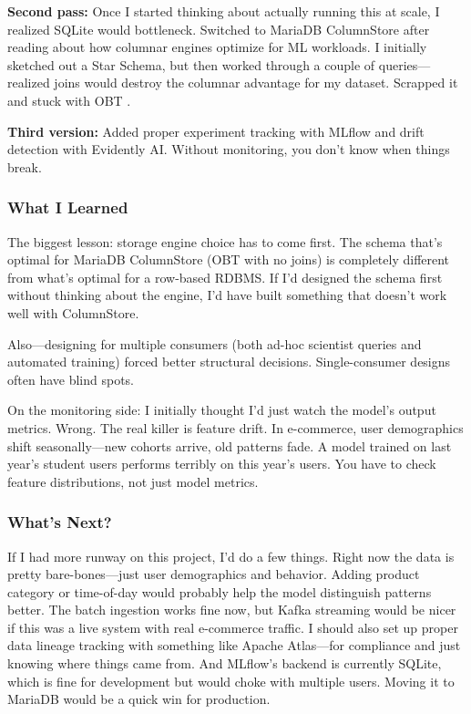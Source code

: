 \documentclass[11pt,a4paper]{article}
\begin{document}
\textbf{Second pass:} Once I started thinking about actually running this at scale, I realized 
SQLite would bottleneck. Switched to MariaDB ColumnStore after reading about how columnar 
engines optimize for ML workloads. I initially sketched out a Star Schema, but then worked 
through a couple of queries—realized joins would destroy the columnar advantage for my dataset. 
Scrapped it and stuck with OBT \citep{zaitsev2021}.

\textbf{Third version:} Added proper experiment tracking with MLflow and drift detection with 
Evidently AI. Without monitoring, you don't know when things break.

\subsubsection*{What I Learned}

The biggest lesson: storage engine choice has to come first. The schema that's optimal for 
MariaDB ColumnStore (OBT with no joins) is completely different from what's optimal for a 
row-based RDBMS. If I'd designed the schema first without thinking about the engine, I'd have 
built something that doesn't work well with ColumnStore.

Also—designing for multiple consumers (both ad-hoc scientist queries and automated training) 
forced better structural decisions. Single-consumer designs often have blind spots.

On the monitoring side: I initially thought I'd just watch the model's output metrics. Wrong. 
The real killer is feature drift. In e-commerce, user demographics shift seasonally—new cohorts 
arrive, old patterns fade. A model trained on last year's student users performs terribly on 
this year's users. You have to check feature distributions, not just model metrics.

\subsubsection*{What's Next?}

If I had more runway on this project, I'd do a few things. Right now the data is pretty bare-bones—just user 
demographics and behavior. Adding product category or time-of-day would probably help the model distinguish 
patterns better. The batch ingestion works fine now, but Kafka streaming would be nicer if this was a live 
system with real e-commerce traffic. I should also set up proper data lineage tracking with something like 
Apache Atlas—for compliance and just knowing where things came from. And MLflow's backend is currently SQLite, 
which is fine for development but would choke with multiple users. Moving it to MariaDB would be a quick win 
for production.

\newpage



\end{document}

